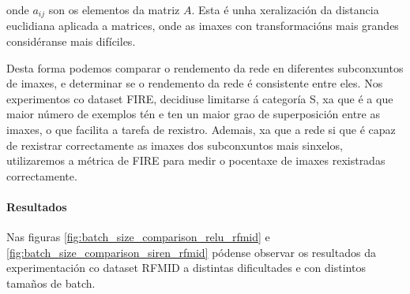 onde $a_{ij}$ son os elementos da matriz $A$.
Esta é unha xeralización da distancia euclidiana aplicada a matrices, onde as imaxes con transformacións mais grandes considéranse mais difíciles.

Desta forma podemos comparar o rendemento da rede en diferentes subconxuntos de imaxes, e determinar se o rendemento da rede é consistente entre eles.
Nos experimentos co dataset FIRE, decidiuse limitarse á categoría S, xa que é a que maior número de exemplos tén e ten un maior grao de superposición entre as imaxes, o que facilita a tarefa de rexistro.
Ademais, xa que a rede si que é capaz de rexistrar correctamente as imaxes dos subconxuntos mais sinxelos, utilizaremos a métrica de FIRE para medir o pocentaxe de imaxes rexistradas correctamente.

\paragraph{Resultados}
\label{par:Resultados-batchsize}

Nas figuras \ref{fig:batch_size_comparison_relu_rfmid} e \ref{fig:batch_size_comparison_siren_rfmid} pódense observar os resultados da experimentación co dataset RFMID a distintas dificultades e con distintos tamaños de batch.

